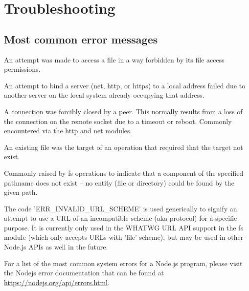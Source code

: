 \section{Troubleshooting}

\subsection{Most common error messages}

An attempt was made to access a file in a way forbidden by its file access permissions.

An attempt to bind a server (net, http, or https) to a local address failed due to another server on the local system already occupying that address.

A connection was forcibly closed by a peer. This normally results from a loss of the connection on the remote socket due to a timeout or reboot. Commonly encountered via the http and net modules.

An existing file was the target of an operation that required that the target not exist.

Commonly raised by fs operations to indicate that a component of the specified pathname does not exist -- no entity (file or directory) could be found by the given path.

The code 'ERR\_INVALID\_URL\_SCHEME' is used generically to signify an attempt to use a URL of an incompatible scheme (aka protocol) for a specific purpose. It is currently only used in the WHATWG URL API support in the fs module (which only accepts URLs with 'file' scheme), but may be used in other Node.js APIs as well in the future.

For a list of the most common system errors for a Node.js program, please visit the Nodejs error documentation that can be found at  \url{https://nodejs.org/api/errors.html}.
